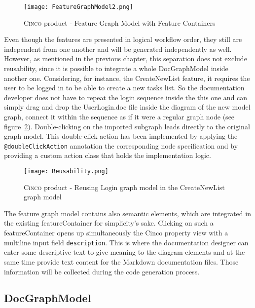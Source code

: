 \begin{figure}[H]
    \centering
    \texttt{[image: FeatureGraphModel2.png]}
    \caption{\textsc{Cinco} product - Feature Graph Model with Feature Containers}
    \label{fig:featGraph}
\end{figure}

Even though the features are presented in logical workflow order, they still are independent from one another and will be generated independently as well. However, as mentioned in the previous chapter, this separation does not exclude reusability, since it is possible to integrate a whole DocGraphModel inside another one. Considering, for instance, the CreateNewList feature, it requires the user to be logged in to be able to create a new tasks list. So the documentation developer does not have to repeat the login sequence inside the this one and can simply drag and drop the UserLogin.doc file inside the diagram of the new model graph, connect it within the sequence as if it were a regular graph node (see figure~\ref{fig:reusability}). Double-clicking on the imported subgraph leads directly to the original graph model. This double-click action has been implemented by applying the \lstinline[language=MGL]{@doubleClickAction} annotation the corresponding node specification and by providing a custom action class that holds the implementation logic.

\begin{figure}[h]
    \centering
    \texttt{[image: Reusability.png]}
    \caption{\textsc{Cinco} product - Reusing Login graph model in the CreateNewList graph model}
    \label{fig:reusability}
\end{figure}

The feature graph model contains also semantic elements, which are integrated in the existing featureContainer for simplicity's sake. Clicking on such a featureContainer opens up simultaneously the Cinco property view with a multiline input field \lstinline{description}. This is where the documentation designer can enter some descriptive text to give meaning to the diagram elements and at the same time provide text content for the Markdown documentation files. Those information will be collected during the code generation process.

\subsection{DocGraphModel}\label{sec:DocGrahpModElem}

